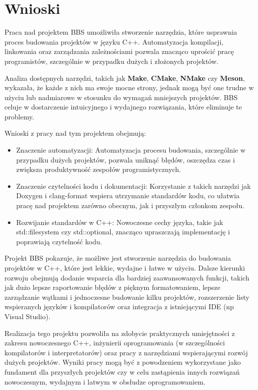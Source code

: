 \chapter{Wnioski}
Praca nad projektem BBS umożliwiła stworzenie narzędzia, które usprawnia proces budowania projektów w języku C++. Automatyzacja kompilacji, linkowania oraz zarządzania zależnościami pozwala znacząco uprościć pracę programistów, szczególnie w przypadku dużych i złożonych projektów.

Analiza dostępnych narzędzi, takich jak \textbf{Make}, \textbf{CMake}, \textbf{NMake} czy \textbf{Meson}, wykazała, że każde z nich ma swoje mocne strony, jednak mogą być one trudne w użyciu lub nadmiarowe w stosunku do wymagań mniejszych projektów. BBS celuje w dostarczenie intuicyjnego i wydajnego rozwiązania, które eliminuje te problemy.

Wnioski z pracy nad tym projektem obejmują:
\begin{itemize}
    \item Znaczenie automatyzacji: Automatyzacja procesu budowania, szczególnie w przypadku dużych projektów, pozwala uniknąć błędów, oszczędza czas i zwiększa produktywność zespołów programistycznych.
    \item Znaczenie czytelności kodu i dokumentacji: Korzystanie z takich narzędzi jak Doxygen i clang-format wspiera utrzymanie standardów kodu, co ułatwia pracę nad projektem zarówno obecnym, jak i przyszłym członkom zespołu.
    \item Rozwijanie standardów w C++: Nowoczesne cechy języka, takie jak std::filesystem czy std::optional, znacząco upraszczają implementację i poprawiają czytelność kodu.
\end{itemize}

Projekt BBS pokazuje, że możliwe jest stworzenie narzędzia do budowania projektów w C++, które jest lekkie, wydajne i łatwe w użyciu. Dalsze kierunki rozwoju obejmują dodanie wsparcia dla bardziej zaawansowanych funkcji, takich jak dużo lepsze raportowanie błędów z pięknym formatowaniem, lepsze zarządzanie wątkami i jednoczesne budowanie kilku projektów, rozszerzenie listy wspieranych języków i kompilatorów oraz integracja z istniejącymi IDE (np Visual Studio).

Realizacja tego projektu pozwoliła na zdobycie praktycznych umiejętności z zakresu nowoczesnego C++, inżynierii oprogramowania (w szczególności kompilatorów i interpretatorów) oraz pracy z narzędziami wspierającymi rozwój dużych projektów. Wyniki pracy mogą być z powodzeniem wykorzystane jako fundament dla przyszłych projektów czy w celu zastąpienia innych rozwiązań nowoczesnym, wydajnym i latwym w obsłudze oprogramowaniem.